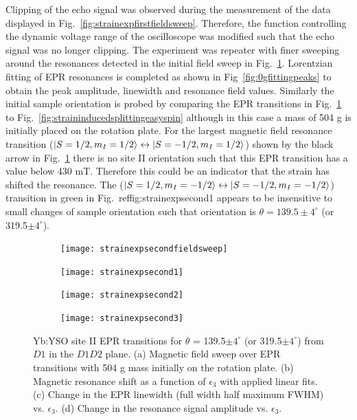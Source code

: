 Clipping of the echo signal was observed during the measurement of the data displayed in Fig.~\ref{fig:strainexpfirstfieldsweep}. Therefore, the function controlling the dynamic voltage range of the oscilloscope was modified such that the echo signal was no longer clipping. The experiment was repeater with finer sweeping around the resonances detected in the initial field sweep in Fig.~\ref{fig:strainexpsecondfieldsweep}. Lorentzian fitting of EPR resonances is completed as shown in Fig~\ref{fig:0gfittingpeaks} to obtain the peak amplitude, linewidth and resonance field values. Similarly the initial sample orientation is probed by comparing the EPR transitions in Fig.~\ref{fig:strainexpsecondfieldsweep} to Fig.~\ref{fig:straininducedsplittingeasyspin} although in this case a mass of 504 g is initially placed on the rotation plate. For the largest magnetic field resonance transition ($\lvert S=1/2,m_{I}=1/2\rangle \leftrightarrow \lvert S=-1/2,m_{I}=1/2\rangle$) shown by the black arrow in Fig.~\ref{fig:strainexpsecondfieldsweep} there is no site II orientation such that this EPR transition has a value below 430 mT. Therefore this could be an indicator that the strain has shifted the resonance. The ($\lvert S=1/2,m_{I}=-1/2\rangle \leftrightarrow \lvert S=-1/2,m_{I}=-1/2\rangle$) transition in green in Fig.~ref{fig:strainexpsecond1} appears to be insensitive to small changes of sample orientation such that orientation is $\theta =139.5 \pm 4^{\circ}$ (or 319.5$\pm 4^{\circ}$).          

\begin{figure}[H]
    \centering
    \begin{subfigure}[b]{0.45\textwidth}
        \centering
        \texttt{[image: strainexpsecondfieldsweep]}
        \caption{\label{fig:strainexpsecondfieldsweep}}
    \end{subfigure}
    \begin{subfigure}[b]{0.45\textwidth}
        \centering
        \texttt{[image: strainexpsecond1]}
   \caption{\label{fig:strainexpsecond1}}
   \end{subfigure}
       \begin{subfigure}[b]{0.45\textwidth}
        \centering
        \texttt{[image: strainexpsecond2]}
   \caption{\label{fig:strainexpsecond1}}
   \end{subfigure}
       \begin{subfigure}[b]{0.45\textwidth}
        \centering
        \texttt{[image: strainexpsecond3]}
   \caption{\label{fig:strainexpsecond1}}
   \end{subfigure}
   \caption{Yb:YSO site II EPR transitions for $\theta$ = 139.5$\pm 4^{\circ}$ (or 319.5$\pm 4^{\circ}$) from $D1$ in the $D1D2$ plane. (a) Magnetic field sweep over EPR transitions with 504 g mass initially on the rotation plate. (b) Magnetic resonance shift as a function of $\epsilon_{3}$ with applied linear fits. (c) Change in the EPR linewidth (full width half maximum FWHM) vs. $\epsilon_{3}$. (d) Change in the resonance signal amplitude vs. $\epsilon_{3}$.}
\end{figure}

